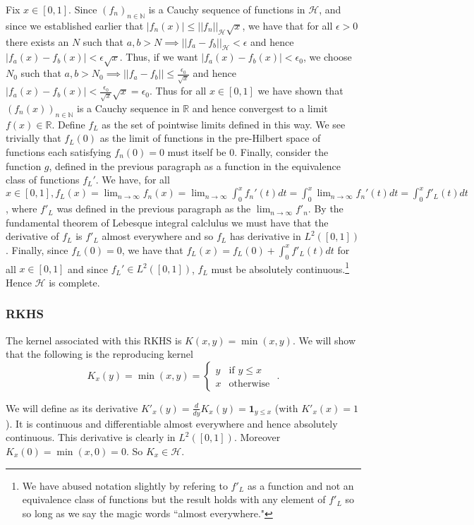\documentclass[12pt]{article}
\begin{document}
Fix $x\in [0,1]$. Since $(f_n)_{n \in \mathbb{N}}$ is a Cauchy sequence of functions in $\mathcal{H}$, and since we established earlier that $|f_n(x)| \leq ||f_n||_\mathcal{H} \sqrt{x}$, we have that for all $\epsilon > 0$ there exists an $N$ such that $a,b > N \implies ||f_a - f_b||_\mathcal{H} < \epsilon$ and hence  $|f_a(x) - f_b(x)| < \epsilon \sqrt{x}$. Thus, if we want $|f_a(x) - f_b(x)| < \epsilon_0$, we choose $N_0$ such that $a,b > N_0 \implies ||f_a - f_b || \leq \frac{\epsilon_0}{\sqrt{x}}$ and hence $|f_a(x) - f_b(x)| < \frac{\epsilon_0}{\sqrt{x}}\sqrt{x} = \epsilon_0.$ Thus for all $x \in [0,1]$ we have shown that $(f_n(x))_{n \in \mathbb{N}}$ is a Cauchy sequence in $\mathbb{R}$ and hence convergest to a limit $f(x) \in \mathbb{R}$. Define $f_L$ as the set of pointwise limits defined in this way. We see trivially that $f_L(0)$ as the limit of functions in the pre-Hilbert space of functions each satisfying $f_n(0) = 0$ must itself be 0. Finally, consider the function $g$, defined in the previous paragraph as a function in the equivalence class of functions $f_L'$. We have, for all $x \in [0,1], f_L(x) = \lim_{n\rightarrow \infty} f_n(x) = \lim_{n\rightarrow \infty} \int_0^x f_n'(t)dt = \int_0^x \lim_{n \rightarrow \infty} f_n'(t) dt = \int_0^x f'_L(t) dt$, where $f'_L$ was defined in the previous paragraph as the $\lim_{n\rightarrow \infty} f'_n$. By the fundamental theorem of Lebesque integral calclulus we must have that the derivative of $f_L$ is $f'_L$ almost everywhere and so $f_L$ has derivative in $L^2([0,1])$. Finally, since $f_L(0) = 0$, we have that $f_L(x) = f_L(0) + \int_0^x f'_L(t) dt$ for all $x \in [0,1]$ and since $f_L'\in L^2([0,1])$, $f_L$ must be absolutely continuous.\footnote{We have abused notation slightly by refering to $f'_L$ as a function and not an equivalence class of functions but the result holds with any element of $f'_L$ so so long as we say the magic words ``almost everywhere."} Hence $\mathcal{H}$ is complete.

\subsubsection{RKHS}
The kernel associated with this RKHS is $K(x,y) = \min(x,y).$ We will show that the following is the reproducing kernel $$K_x(y) = \min(x,y) = \begin{cases} y &\mbox{if } y \leq x \\ 
x & \mbox{otherwise } \end{cases}.$$ 

We will define as its derivative $K'_x(y) = \frac{d}{dy} K_x(y) = \mathbf{1}_{y \leq x}$ (with $K'_x(x) = 1$). It is continuous and differentiable almost everywhere and hence absolutely continuous. This derivative is clearly in $L^2([0,1])$. Moreover $K_x(0) = \min(x,0) = 0$. So $K_x \in \mathcal{H}$. 
\end{document}
